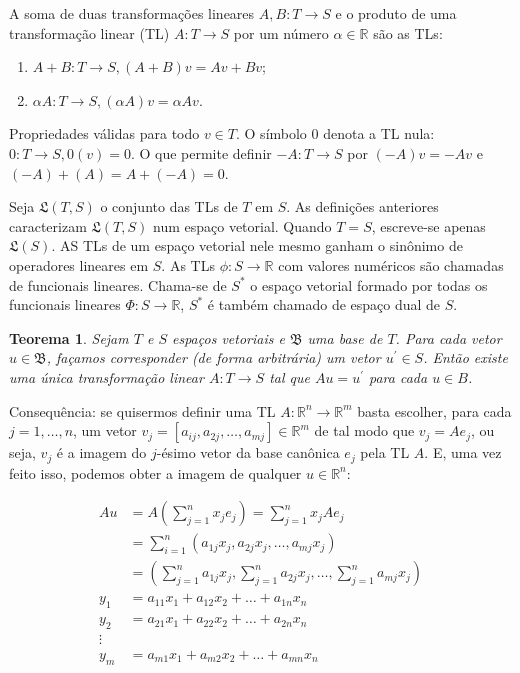 \documentclass[a4paper,portuguese,9pt]{extarticle}
\newtheorem{theorem}{Teorema}[section]
\begin{document}
\begin{multicols*}{2}
A soma de duas transformações lineares $A,B : T \rightarrow S$ e o produto de uma transformação linear (TL) $A:T \rightarrow S$ por um número $\alpha \in \mathbb{R}$ são as TLs:

\begin{enumerate}[label=(\roman*)]
    \item $A + B: T \rightarrow S, (A+B)v=Av+Bv$;
    \item $\alpha A:T \rightarrow S, (\alpha A)v=\alpha Av$.
\end{enumerate}
Propriedades válidas para todo $v \in T$. O símbolo $0$ denota a TL nula: $0:T \rightarrow S, 0(v)=0$. O que permite definir $-A:T \rightarrow S$ por $(-A)v=-Av$ e 
$(-A)+ (A) = A + (-A) =0$. 

Seja $\mathfrak{L}(T,S)$ o conjunto das TLs de $T$ em $S$. As definições anteriores caracterizam $\mathfrak{L}(T,S)$ num espaço vetorial. Quando $T=S$, escreve-se apenas $\mathfrak{L}(S)$. AS TLs de um espaço vetorial nele mesmo ganham o sinônimo de operadores lineares em $S$. As TLs $\phi : S\rightarrow \mathbb{R}$ com valores numéricos são chamadas de funcionais lineares. Chama-se de $S^{*}$ o espaço vetorial formado por todas os funcionais lineares $\Phi : S\rightarrow \mathbb{R}$, $S^{*}$ 
é também chamado de espaço dual de $S$.

\begin{theorem}
Sejam $T$ e $S$ espaços vetoriais e $\mathfrak{B}$ uma base de $T$. Para cada
    vetor $u \in \mathfrak{B}$, façamos corresponder (de forma arbitrária) um
    vetor $u^\prime \in S$. Então existe uma única transformação linear $A:T
    \rightarrow S$ tal que  $Au=u^\prime$ para cada $u \in B$.
\end{theorem}

Consequência: se quisermos definir uma TL $A: \mathbb{R}^n \rightarrow \mathbb{R}^m$ basta escolher, para cada $j=1,\ldots, n$, um vetor $v_j = [a_{ij}, a_{2j}, \ldots, a_{mj}] \in \mathbb{R}^{m}$ de tal modo que $v_j=Ae_j$, ou seja, $v_j$ é a imagem do $j$-ésimo vetor da base canônica $e_j$ pela TL $A$. E, uma vez feito isso, podemos obter a imagem de qualquer $u \in \mathbb{R}^{n}$:

\begin{equation*}
    \begin{split} 
        Au & = A ( \sum_{j=1}^{n} x_j e _j ) = \sum_{j=1}^{n} x_j A  e_j \\
        & = \sum_{i=1}^{n} (a_{1j}x_j, a_{2j}x_j, \ldots, a_{mj}x_j) \\
        & = (\sum_{j=1}^{n} a_{1j} x_j, \sum_{j=1}^{n} a_{2j} x_j, \ldots, \sum_{j=1}^{n} a_{mj} x_j) \\
        y_1 & = a_{11} x_1 + a_{12} x_2 + \ldots + a_{1n}x_n \\
        y_2 & = a_{21} x_1 + a_{22} x_2 + \ldots + a_{2n}x_n \\
        \vdots \\
         y_m & = a_{m1} x_1 + a_{m2} x_2 + \ldots + a_{mn}x_n 
    \end{split}
\end{equation*}


\end{multicols*}
\end{document}
